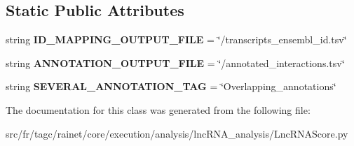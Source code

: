 \subsection*{Static Public Attributes}
\begin{DoxyCompactItemize}
\item 
\hypertarget{classLncRNAScore_1_1LncRNAScore_aa7bc87b3f5b74d5808bbecb9eb0c4788}{string {\bfseries I\-D\-\_\-\-M\-A\-P\-P\-I\-N\-G\-\_\-\-O\-U\-T\-P\-U\-T\-\_\-\-F\-I\-L\-E} = \char`\"{}/transcripts\-\_\-ensembl\-\_\-id.\-tsv\char`\"{}}\label{classLncRNAScore_1_1LncRNAScore_aa7bc87b3f5b74d5808bbecb9eb0c4788}

\item 
\hypertarget{classLncRNAScore_1_1LncRNAScore_abfe8e46ab578a5172c4f675a9240dd32}{string {\bfseries A\-N\-N\-O\-T\-A\-T\-I\-O\-N\-\_\-\-O\-U\-T\-P\-U\-T\-\_\-\-F\-I\-L\-E} = \char`\"{}/annotated\-\_\-interactions.\-tsv\char`\"{}}\label{classLncRNAScore_1_1LncRNAScore_abfe8e46ab578a5172c4f675a9240dd32}

\item 
\hypertarget{classLncRNAScore_1_1LncRNAScore_a76bd5d7ff4b1c1bb59fb1f79f547982f}{string {\bfseries S\-E\-V\-E\-R\-A\-L\-\_\-\-A\-N\-N\-O\-T\-A\-T\-I\-O\-N\-\_\-\-T\-A\-G} = \char`\"{}Overlapping\-\_\-annotations\char`\"{}}\label{classLncRNAScore_1_1LncRNAScore_a76bd5d7ff4b1c1bb59fb1f79f547982f}

\end{DoxyCompactItemize}


The documentation for this class was generated from the following file\-:\begin{DoxyCompactItemize}
\item 
src/fr/tagc/rainet/core/execution/analysis/lnc\-R\-N\-A\-\_\-analysis/Lnc\-R\-N\-A\-Score.\-py\end{DoxyCompactItemize}
